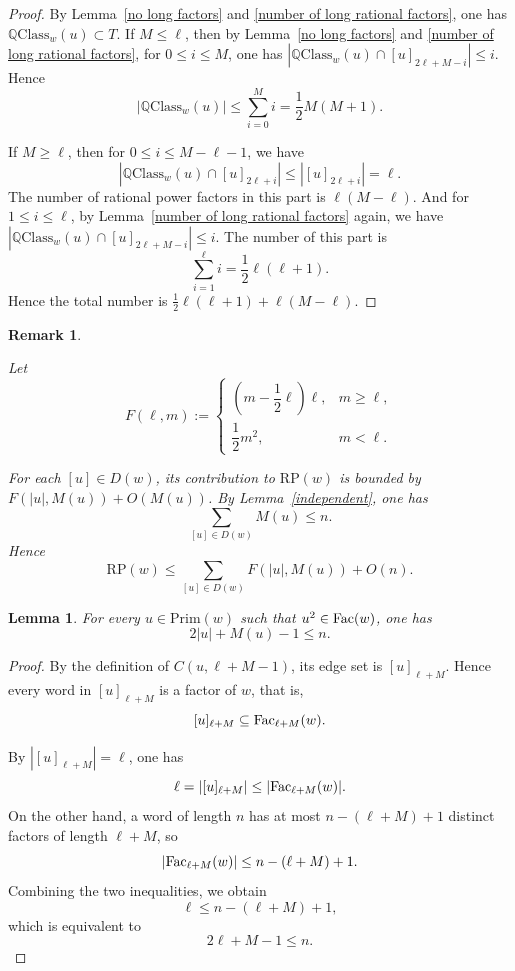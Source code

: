 \documentclass[runningheads,envcountsame,a4paper]{llncs}
\newtheorem{lem}[thm]{Lemma}
\newtheorem{rmk}[thm]{Remark}
\newcommand{\fac}{\hbox{\rm Fac}}
\newcommand{\pri}{\mathrm{Prim}}
\newcommand{\qcl}{\mathbb{Q}\mathrm{Class}}
\newcommand{\rp}{\mathrm{RP}}
\begin{document}
\begin{proof}
By Lemma~\ref{no long factors} and \ref{number of long rational factors}, one has $\qcl_w(u)\subset T$. If $M\le\ell$, then by Lemma~\ref{no long factors} and \ref{number of long rational factors}, for $0\le i\le M$, one has $|\qcl_w(u) \cap [u]_{2\ell+M-i}|\le i$. Hence 
$$|\qcl_w(u)|\le \sum\limits_{i=0}^M i=\frac12 M(M+1).$$
 
If $M\ge\ell$, then for $0\le i\le M-\ell-1$, we have 
$$|\qcl_w(u) \cap [u]_{2\ell+i}| \le |[u]_{2\ell+i}|=\ell.$$
The number of rational power factors in this part is $\ell(M-\ell)$.
And for $1\le i\le \ell$, by Lemma~\ref{number of long rational factors} again, we have $|\qcl_w(u) \cap [u]_{2\ell+M-i}|\le i$. The number of this part is 
$$\sum\limits_{i=1}^{\ell} i=\frac12 \ell(\ell+1).$$
Hence the total number is $ \frac12 \ell(\ell+1)+\ell(M-\ell)$.


\end{proof}

\begin{rmk}\label{estimation for RP in total}
    
Let
\[
F(\ell,m):=
\begin{cases}
\left(m-\dfrac12\ell\right)\ell,& m\ge \ell,\\[1ex]
\dfrac12 m^2,& m<\ell.
\end{cases}
\]

For each $[u]\in D(w)$, its contribution
to $\rp(w)$ is bounded by $F(|u|,M(u))+O(M(u))$. By Lemma~\ref{independent}, one has
\[
\sum_{[u]\in D(w)} M(u)\le n.
\]
Hence
\[
\rp(w)\le \sum_{[u]\in D(w)} F(|u|,M(u)) + O(n).
\]

\end{rmk}

\begin{lem}\label{restriction on length and number of sc}
For every $u\in\pri(w)$ such that $u^2\in\fac(w)$, one has
\[
2|u|+M(u)-1\le n.
\]
\end{lem}

\begin{proof}
By the definition of $C(u,\ell+M-1)$, its edge set is $[u]_{\ell+M}$. Hence every word in $[u]_{\ell+M}$ is a factor of $w$, that is,
\[
[u]_{\ell+M} \subseteq \fac_{\ell+M}(w).
\]

By $|[u]_{\ell+M}|=\ell$, one has
\[
\ell = |[u]_{\ell+M}|
   \le |\fac_{\ell+M}(w)|.
\]
On the other hand, a word of length $n$ has at most $n-(\ell+M)+1$ distinct
factors of length $\ell+M$, so
\[
|\fac_{\ell+M}(w)| \le n-(\ell+M)+1.
\]
Combining the two inequalities, we obtain
\[
\ell \le n-(\ell+M)+1,
\]
which is equivalent to
\[
2\ell + M - 1 \le n.
\]

\end{proof}
\end{document}
